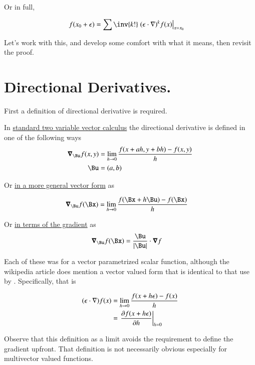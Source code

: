 Or in full,

\begin{align}\label{eqn:multivector_taylors:taylorMulti}
f(x_0 + \epsilon) 
&= \sum \inv{k!} \left. {(\epsilon \cdot \grad)^k} f(x) \right\vert_{x=x_0}
\end{align}

Let's work with this, and develop some comfort with what it means, then revisit the proof.

\section{Directional Derivatives. }

First a definition of directional derivative is required.

In 
\href{http://tutorial.math.lamar.edu/Classes/CalcIII/DirectionalDeriv.aspx}{standard two variable vector calculus} the directional derivative is defined in one of the following ways
\begin{align}
\spacegrad_\Bu f(x,y) &= \lim_{h \rightarrow 0} \frac{f(x + a h, y + b h) - f(x,y)}{h} \\
\Bu &= (a,b)
\end{align}

Or \href{http://en.wikipedia.org/wiki/Directional_derivative}{in a more general vector form} as 

\begin{align}
\spacegrad_\Bu f(\Bx) &= \lim_{h \rightarrow 0} \frac{f(\Bx + h\Bu) - f(\Bx)}{h}
\end{align}

Or \href{http://mathworld.wolfram.com/DirectionalDerivative.html}{in terms of the gradient} as 
\begin{align}
\spacegrad_\Bu f(\Bx) &= \frac{\Bu}{\Abs{\Bu}} \cdot \spacegrad f
\end{align}

Each of these was for a vector parametrized scalar function, although the wikipedia article does mention a vector valued form
that is identical to that use by \cite{doran2003gap}.  Specifically, that is

\begin{align}
(\epsilon \cdot \grad) f(x) 
&= \lim_{h \rightarrow 0} \frac{f(x + h \epsilon) - f(x)}{h} \\
&= \left. \PD{h}{f(x + h \epsilon)} \right\vert_{h=0}
\end{align}

Observe that this definition as a limit avoids the requirement to define the gradient upfront.  That definition is not necessarily 
obvious especially for multivector valued functions.

